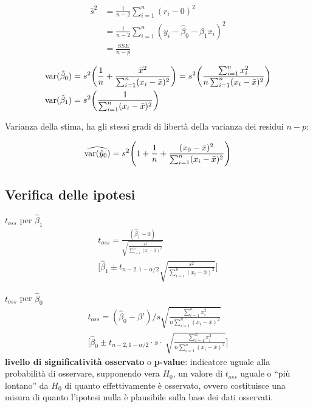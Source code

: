 \begin{align*} 
\hat{s}^2 &= \frac{1}{n-2}\sum\limits_{i=1}^n (r_{i} - 0)^2\\
				 &= \frac{1}{n-2}\sum\limits_{i=1}^n (y_i - \hat{\beta}_0 - \hat{\beta}_1x_i)^2 \\
				 &= \frac{SSE}{n-p}
\end{align*}

\begin{align*}
	\text{var}(\hat{\beta}_0) &= s^2 \bigg( \frac{1}{n} + \frac{\bar{x}^2}{\sum_{i=1}^{n} (x_i - \bar{x})^2}\bigg) = s^2 \bigg(\frac{\sum_{i=1}^{n}x_i^2}{n\sum_{i=1}^{n} (x_i - \bar{x})^2}\bigg) \\
	\text{var}(\hat{\beta}_1) &= s^2 \bigg( \frac{1}{\sum_{i=1}^{n} (x_i - \bar{x})^2} \bigg)
\end{align*}

Varianza della stima, ha gli stessi gradi di libertà della varianza dei residui $n-p$:

$$
\widehat{\text{var}(\hat{y}_0)} = s^2 \Bigg( 1 + \frac{1}{n} + \frac{(x_0 - \bar{x})^2}{\sum_{i=1}^{n} (x_i - \bar{x})^2} \Bigg)
$$

\subsection{Verifica delle ipotesi}
$ t_{oss} $ per $ \hat{\beta}_1 $
\begin{align*}
t_{oss} = \frac{(\hat{\beta}_1 - 0)}{\sqrt{\frac{s^2}{\sum_{i=1}^{n} (x_i - \bar{x})^2}}} \\
\Bigg[ \hat{\beta}_1 \pm t_{n-2, 1-\alpha/2}  \sqrt{\frac{s^2}{\sum_{i=i}^{n} (x_i - \bar{x})^2}}\Bigg]
\end{align*}

$ t_{oss} $ per $ \hat{\beta}_0 $
\begin{align*}
t_{oss}  = (\hat{\beta}_0 - \beta') \Bigg/ s \sqrt{\frac{\sum_{i=1}^{n} x_{i}^2}{n \sum_{i=1}^{n} (x_i - \bar{x})^2}} \\
\Bigg[ \hat{\beta}_0 \pm t_{n-2, 1-\alpha/2} \cdot s \cdot \: \sqrt{\frac{\sum_{i=1}^{n} x_{i}^2}{n \sum_{i=1}^{n} (x_i - \bar{x})^2}} \Bigg]
\end{align*}
\textbf{livello di significatività osservato} o \textbf{p-value}: indicatore uguale alla probabilità di osservare, supponendo vera $ H_0 $, un valore di $ t_{oss} $ uguale o ``più lontano'' da $ H_0 $ di quanto effettivamente è osservato, ovvero costituisce una misura di quanto l'ipotesi nulla è plausibile sulla base dei dati osservati.

